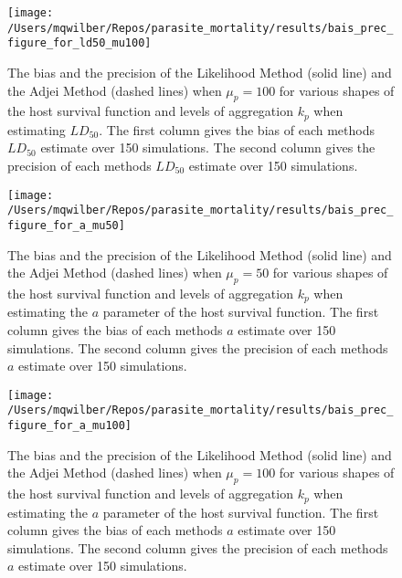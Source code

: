 \documentclass[12pt, a4paper]{article}
\begin{document}
\begin{figure}

    \texttt{[image: /Users/mqwilber/Repos/parasite\_mortality/results/bais\_prec\_figure\_for\_ld50\_mu100]}

    \caption{The bias and the precision of the Likelihood Method (solid line) and the Adjei Method (dashed lines) when $\mu_p = 100$ for various shapes of the host survival function and levels of aggregation $k_p$ when estimating $LD_{50}$.  The first column gives the bias of each methods $LD_{50}$ estimate over 150 simulations. The second column gives the precision of each methods $LD_{50}$ estimate over 150 simulations.}

    \label{fig:biasld50_100}

\end{figure}

\begin{figure}

    \texttt{[image: /Users/mqwilber/Repos/parasite\_mortality/results/bais\_prec\_figure\_for\_a\_mu50]}

    \caption{The bias and the precision of the Likelihood Method (solid line) and the Adjei Method (dashed lines) when $\mu_p = 50$ for various shapes of the host survival function and levels of aggregation $k_p$ when estimating the $a$ parameter of the host survival function.  The first column gives the bias of each methods $a$ estimate over 150 simulations. The second column gives the precision of each methods $a$ estimate over 150 simulations.}

    \label{fig:biasa_50}

\end{figure}

\begin{figure}

    \texttt{[image: /Users/mqwilber/Repos/parasite\_mortality/results/bais\_prec\_figure\_for\_a\_mu100]}

    \caption{The bias and the precision of the Likelihood Method (solid line) and the Adjei Method (dashed lines) when $\mu_p = 100$ for various shapes of the host survival function and levels of aggregation $k_p$ when estimating the $a$ parameter of the host survival function.  The first column gives the bias of each methods $a$ estimate over 150 simulations. The second column gives the precision of each methods $a$ estimate over 150 simulations.}

    \label{fig:biasa_100}

\end{figure}
\end{document}
